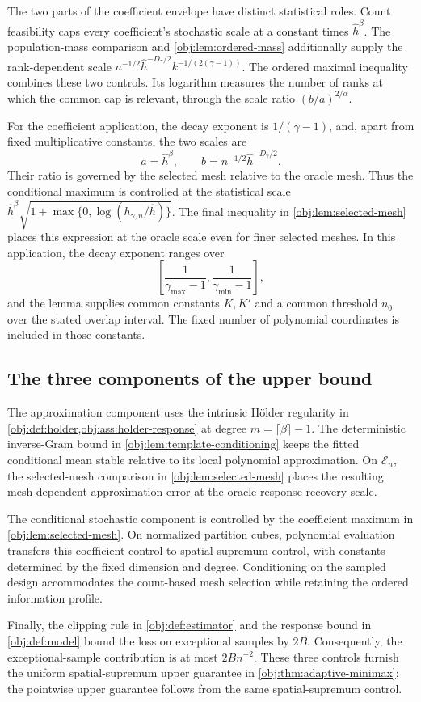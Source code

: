 The two parts of the coefficient envelope have distinct statistical roles. Count feasibility caps every coefficient's stochastic scale at a constant times \(\widehat h^\beta\). The population-mass comparison and \cref{obj:lem:ordered-mass} additionally supply the rank-dependent scale
\(n^{-1/2}\widehat h^{-D_\gamma/2}k^{-1/(2(\gamma-1))}\).
The ordered maximal inequality combines these two controls. Its logarithm measures the number of ranks at which the common cap is relevant, through the scale ratio \((b/a)^{2/\alpha}\).

For the coefficient application, the decay exponent is \(1/(\gamma-1)\), and, apart from fixed multiplicative constants, the two scales are
\[
a=\widehat h^\beta,
\qquad
b=n^{-1/2}\widehat h^{-D_\gamma/2}.
\]
Their ratio is governed by the selected mesh relative to the oracle mesh. Thus the conditional maximum is controlled at the statistical scale
\(\widehat h^\beta\sqrt{1+\max\{0,\log(h_{\gamma,n}/\widehat h)\}}\).
The final inequality in \cref{obj:lem:selected-mesh} places this expression at the oracle scale even for finer selected meshes. In this application, the decay exponent ranges over
\[
\left[
\frac{1}{\gamma_{\max}-1},
\frac{1}{\gamma_{\min}-1}
\right],
\]
and the lemma supplies common constants \(K,K'\) and a common threshold \(n_0\) over the stated overlap interval. The fixed number of polynomial coordinates is included in those constants.

\subsection{The three components of the upper bound}

The approximation component uses the intrinsic Hölder regularity in \cref{obj:def:holder,obj:ass:holder-response} at degree \(m=\lceil\beta\rceil-1\). The deterministic inverse-Gram bound in \cref{obj:lem:template-conditioning} keeps the fitted conditional mean stable relative to its local polynomial approximation. On \(\mathcal E_n\), the selected-mesh comparison in \cref{obj:lem:selected-mesh} places the resulting mesh-dependent approximation error at the oracle response-recovery scale.

The conditional stochastic component is controlled by the coefficient maximum in \cref{obj:lem:selected-mesh}. On normalized partition cubes, polynomial evaluation transfers this coefficient control to spatial-supremum control, with constants determined by the fixed dimension and degree. Conditioning on the sampled design accommodates the count-based mesh selection while retaining the ordered information profile.

Finally, the clipping rule in \cref{obj:def:estimator} and the response bound in \cref{obj:def:model} bound the loss on exceptional samples by \(2B\). Consequently, the exceptional-sample contribution is at most \(2Bn^{-2}\). These three controls furnish the uniform spatial-supremum upper guarantee in \cref{obj:thm:adaptive-minimax}; the pointwise upper guarantee follows from the same spatial-supremum control.
